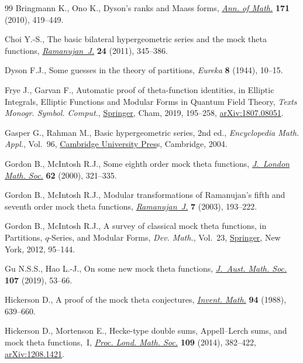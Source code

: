 \documentclass[10pt,a4paper]{amsart}
\numberwithin{equation}{section}
\begin{document}
\begin{thebibliography}{99}
Bringmann K., Ono K., Dyson's ranks and {M}aass forms,
  \href{https://doi.org/10.4007/annals.2010.171.419}{\textit{Ann. of Math.}}
  \textbf{171} (2010), 419--449.

Choi Y.-S., The basic bilateral hypergeometric series and the mock theta
  functions,
  \href{https://doi.org/10.1007/s11139-010-9269-7}{\textit{Ramanujan~J.}}
  \textbf{24} (2011), 345--386.

Dyson F.J., Some guesses in the theory of partitions, \textit{Eureka}
  \textbf{8} (1944), 10--15.

Frye J., Garvan F., Automatic proof of theta-function identities, in Elliptic
  {I}ntegrals, {E}lliptic {F}unctions and {M}odular {F}orms in {Q}uantum
  {F}ield {T}heory, \textit{Texts Monogr. Symbol. Comput.},
  \href{https://doi.org/10.1007/978-3-030-04480-0_10}{Springer}, Cham, 2019,
  195--258, \href{http://arxiv.org/abs/1807.08051}{arXiv:1807.08051}.

Gasper G., Rahman M., Basic hypergeometric series, 2nd ed., \textit{Encyclopedia Math.
  Appl.}, Vol.~96,
  \href{https://doi.org/10.1017/CBO9780511526251}{Cambridge University Pres}s,
  Cambridge, 2004.

Gordon B., McIntosh R.J., Some eighth order mock theta functions,
  \href{https://doi.org/10.1112/S0024610700008735}{\textit{J.~London Math.
  Soc.}} \textbf{62} (2000), 321--335.

Gordon B., McIntosh R.J., Modular transformations of {R}amanujan's fifth and
  seventh order mock theta functions, \href{https://doi.org/10.1023/A:1026299229509}{\textit{Ramanujan~J.}} \textbf{7} (2003), 193--222.

Gordon B., McIntosh R.J., A survey of classical mock theta functions, in
  Partitions, {$q$}-{S}eries, and {M}odular {F}orms, \textit{Dev. Math.},
  Vol.~23, \href{https://doi.org/10.1007/978-1-4614-0028-8_9}{Springer}, New
  York, 2012, 95--144.

Gu N.S.S., Hao L.-J., On some new mock theta functions,
  \href{https://doi.org/10.1017/s1446788718000368}{\textit{J.~Aust. Math.
  Soc.}} \textbf{107} (2019), 53--66.

Hickerson D., A proof of the mock theta conjectures,
  \href{https://doi.org/10.1007/BF01394279}{\textit{Invent. Math.}} \textbf{94}
  (1988), 639--660.

Hickerson D., Mortenson E., Hecke-type double sums, {A}ppell--{L}erch sums, and
  mock theta functions,~{I},
  \href{https://doi.org/10.1112/plms/pdu007}{\textit{Proc. Lond. Math. Soc.}}
  \textbf{109} (2014), 382--422,
  \href{http://arxiv.org/abs/1208.1421}{arXiv:1208.1421}.


\end{thebibliography}
\end{document}
